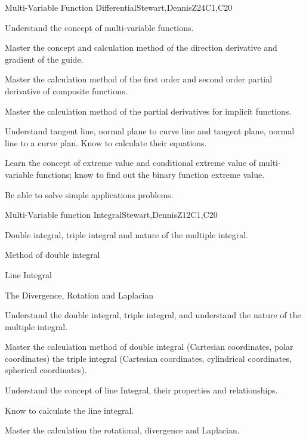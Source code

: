 \begin{syllabus}
\begin{unit}{Multi-Variable Function Differential}{}{Stewart,DennisZ}{24}{C1,C20}
   \begin{learningoutcomes}
    \item Understand the concept of multi-variable functions.
    \item Master the concept and calculation method of the direction derivative and gradient of the guide.
    \item Master the calculation method of the first order and second order partial derivative of composite functions.
    \item Master the calculation method of the partial derivatives for implicit functions.
    \item Understand tangent line, normal plane to curve line and tangent plane, normal line to a curve plan. Know to calculate their equations.
    \item Learn the concept of extreme value and conditional extreme value of multi-variable functions; know to find out the binary function extreme value.
    \item Be able to solve simple applications problems.
    \end{learningoutcomes}
\end{unit}

\begin{unit}{Multi-Variable function Integral}{}{Stewart,DennisZ}{12}{C1,C20}
  \begin{topics}
    \item Double integral, triple integral and nature of the multiple integral.
    \item Method of double integral
    \item Line Integral
    \item The Divergence, Rotation and Laplacian
   \end{topics}
  
  \begin{learningoutcomes}
    \item Understand the double integral, triple integral, and understand the nature of the multiple integral.
    \item Master the calculation method of double integral (Cartesian coordinates, polar coordinates) the triple integral (Cartesian coordinates, cylindrical coordinates, spherical coordinates).
    \item Understand the concept of line Integral, their properties and relationships.
    \item Know to calculate the line integral.
    \item Master the calculation the rotational, divergence and Laplacian.   
  

\end{learningoutcomes}
\end{unit}
\end{syllabus}

